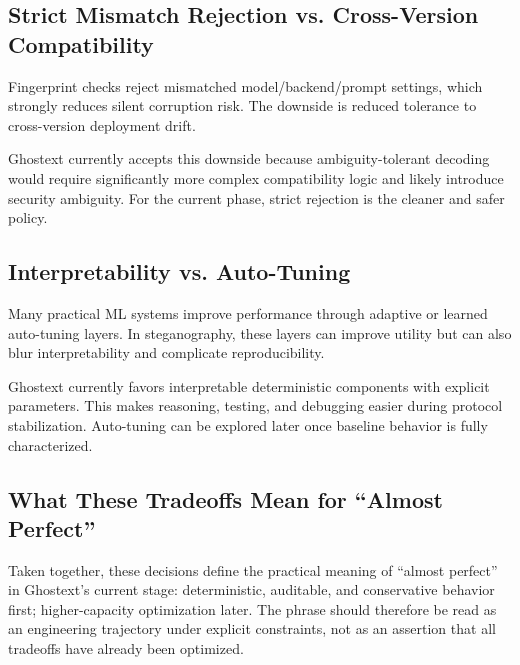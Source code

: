 \subsection{Strict Mismatch Rejection vs. Cross-Version Compatibility}

Fingerprint checks reject mismatched model/backend/prompt settings, which strongly reduces silent corruption risk. The downside is reduced tolerance to cross-version deployment drift.

Ghostext currently accepts this downside because ambiguity-tolerant decoding would require significantly more complex compatibility logic and likely introduce security ambiguity. For the current phase, strict rejection is the cleaner and safer policy.

\subsection{Interpretability vs. Auto-Tuning}

Many practical ML systems improve performance through adaptive or learned auto-tuning layers. In steganography, these layers can improve utility but can also blur interpretability and complicate reproducibility.

Ghostext currently favors interpretable deterministic components with explicit parameters. This makes reasoning, testing, and debugging easier during protocol stabilization. Auto-tuning can be explored later once baseline behavior is fully characterized.

\subsection{What These Tradeoffs Mean for ``Almost Perfect''}

Taken together, these decisions define the practical meaning of ``almost perfect'' in Ghostext's current stage: deterministic, auditable, and conservative behavior first; higher-capacity optimization later. The phrase should therefore be read as an engineering trajectory under explicit constraints, not as an assertion that all tradeoffs have already been optimized.
